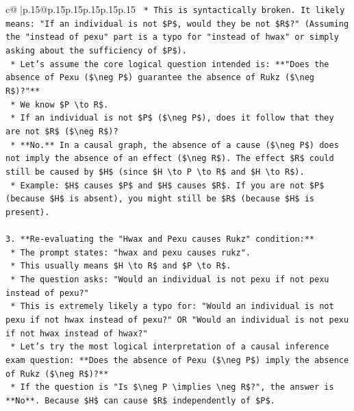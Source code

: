 \documentclass{article}
\begin{document}
{\begin{supertabular}{c@{$\;$}|p{.15\linewidth}@{}p{.15\linewidth}p{.15\linewidth}p{.15\linewidth}p{.15\linewidth}p{.15\linewidth}}
{{{\texttt{        *   This is syntactically broken. It likely means: "If an individual is not \$P\$, would they be not \$R\$?" (Assuming the "instead of pexu" part is a typo for "instead of hwax" or simply asking about the sufficiency of \$P\$).} \\
\texttt{    *   Let's assume the core logical question intended is: **"Does the absence of Pexu (\$\textbackslash{}neg P\$) guarantee the absence of Rukz (\$\textbackslash{}neg R\$)?"**} \\
\texttt{        *   We know \$P \textbackslash{}to R\$.} \\
\texttt{        *   If an individual is not \$P\$ (\$\textbackslash{}neg P\$), does it follow that they are not \$R\$ (\$\textbackslash{}neg R\$)?} \\
\texttt{        *   **No.** In a causal graph, the absence of a cause (\$\textbackslash{}neg P\$) does not imply the absence of an effect (\$\textbackslash{}neg R\$). The effect \$R\$ could still be caused by \$H\$ (since \$H \textbackslash{}to P \textbackslash{}to R\$ and \$H \textbackslash{}to R\$).} \\
\texttt{        *   Example: \$H\$ causes \$P\$ and \$H\$ causes \$R\$. If you are not \$P\$ (because \$H\$ is absent), you might still be \$R\$ (because \$H\$ is present).} \\
\\ 
\texttt{3.  **Re{-}evaluating the "Hwax and Pexu causes Rukz" condition:**} \\
\texttt{    *   The prompt states: "hwax and pexu causes rukz".} \\
\texttt{    *   This usually means \$H \textbackslash{}to R\$ and \$P \textbackslash{}to R\$.} \\
\texttt{    *   The question asks: "Would an individual is not pexu if not pexu instead of pexu?"} \\
\texttt{    *   This is extremely likely a typo for: "Would an individual is not pexu if not hwax instead of pexu?" OR "Would an individual is not pexu if not hwax instead of hwax?"} \\
\texttt{    *   Let's try the most logical interpretation of a causal inference exam question: **Does the absence of Pexu (\$\textbackslash{}neg P\$) imply the absence of Rukz (\$\textbackslash{}neg R\$)?**} \\
\texttt{        *   If the question is "Is \$\textbackslash{}neg P \textbackslash{}implies \textbackslash{}neg R\$?", the answer is **No**. Because \$H\$ can cause \$R\$ independently of \$P\$.} \\
}}}
\end{supertabular}}
\end{document}
